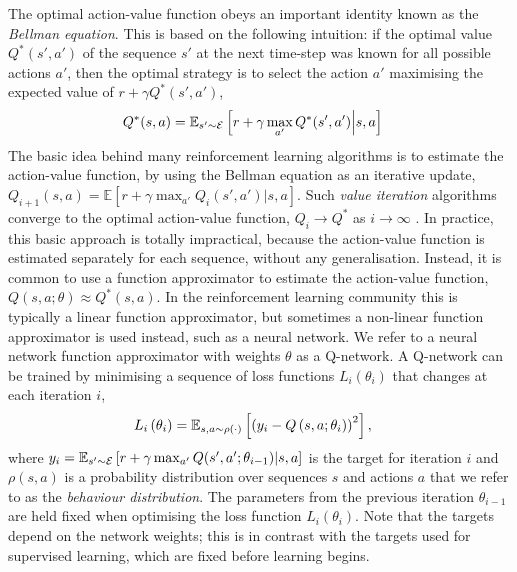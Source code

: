 \documentclass{article} %
\begin{document}
The optimal action-value function obeys an important identity known as the \emph{Bellman equation}. This is based on the following intuition: if the optimal value $Q^*(s',a')$ of the sequence $s'$ at the next time-step was known for all possible actions $a'$, then the optimal strategy is to select the action $a'$ maximising the expected value of $r + \gamma Q^*(s',a')$,
%
\begin{align}
Q^*(s,a) &= \mathbb{E}_{s' \sim \mathcal{E}} \left[  r + \gamma \max_{a'} Q^*(s', a') \Big| s, a  \right]
\end{align}
%
The basic idea behind many reinforcement learning algorithms is to estimate the action-value function, by using the Bellman equation as an iterative update, $Q_{i+1}(s,a) = \mathbb{E}\left[ r + \gamma \max_{a'} Q_i(s', a') | s, a \right]$. Such \emph{value iteration} algorithms converge to the optimal action-value function, $Q_i \rightarrow Q^*$ as $i \rightarrow \infty$ \cite{sutton:book}. In practice, this basic approach is totally impractical, because the action-value function is estimated separately for each sequence, without any generalisation. Instead, it is common to use a function approximator to estimate the action-value function, $Q(s,a; \theta) \approx Q^*(s,a)$. In the reinforcement learning community this is typically a linear function approximator, but sometimes a non-linear function approximator is used instead, such as a neural network. We refer to a neural network function approximator with weights $\theta$ as a Q-network. A Q-network can be trained by minimising a sequence of loss functions $L_i(\theta_i)$ that changes at each iteration $i$,
%
\begin{align}
L_i\left(\theta_i\right) &= \mathbb{E}_{s,a \sim \rho(\cdot)} \left[ \left(y_i - Q \left(s,a ; \theta_i \right) \right)^2 \right],
\label{eq:q-learning-loss}
\end{align}
%
where $y_i = \mathbb{E}_{s' \sim \mathcal{E}} \left[ r + \gamma \max_{a'} Q(s', a'; \theta_{i-1}) | s, a  \right]$ is the target for iteration $i$ and $\rho(s,a)$ is a probability distribution over sequences $s$ and actions $a$ that we refer to as the \emph{behaviour distribution}. The parameters from the previous iteration $\theta_{i-1}$ are held fixed when optimising the loss function $L_i\left(\theta_i\right)$. 
Note that the targets depend on the network weights; this is in contrast with the targets used for supervised learning, which are fixed before learning begins.
\end{document}
